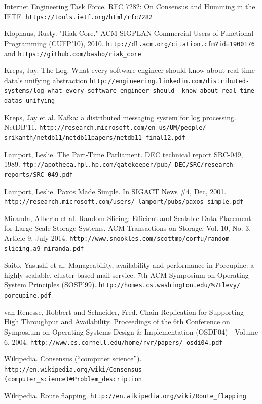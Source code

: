 \documentclass[preprint,10pt]{sigplanconf}
\begin{document}
\begin{thebibliography}{}
Internet Engineering Task Force.
RFC 7282: On Consensus and Humming in the IETF.
{\tt https://tools.ietf.org/html/rfc7282}

Klophaus, Rusty.
"Riak Core."
ACM SIGPLAN Commercial Users of Functional Programming (CUFP'10), 2010.
{\tt http://dl.acm.org/citation.cfm?id=1900176} and
{\tt https://github.com/basho/riak\_core}

Kreps, Jay.
The Log: What every software engineer should know about real-time data's unifying abstraction
{\tt http://engineering.linkedin.com/distributed-
  systems/log-what-every-software-engineer-should-
  know-about-real-time-datas-unifying}

Kreps, Jay et al.
Kafka: a distributed messaging system for log processing.
NetDB’11.
{\tt http://research.microsoft.com/en-us/UM/people/
  srikanth/netdb11/netdb11papers/netdb11-final12.pdf}

Lamport, Leslie.
The Part-Time Parliament.
DEC technical report SRC-049, 1989.
{\tt ftp://apotheca.hpl.hp.com/gatekeeper/pub/ DEC/SRC/research-reports/SRC-049.pdf}

Lamport, Leslie.
Paxos Made Simple.
In SIGACT News \#4, Dec, 2001.
{\tt http://research.microsoft.com/users/ lamport/pubs/paxos-simple.pdf}

Miranda, Alberto et al.
Random Slicing: Efficient and Scalable Data Placement for Large-Scale Storage Systems.
ACM Transactions on Storage, Vol. 10, No. 3, Article 9, July 2014.
{\tt http://www.snookles.com/scottmp/corfu/random- slicing.a9-miranda.pdf}

Saito, Yasushi et al.
Manageability, availability and performance in Porcupine: a highly scalable, cluster-based mail service.
7th ACM Symposium on Operating System Principles (SOSP’99).
{\tt http://homes.cs.washington.edu/\%7Elevy/ porcupine.pdf}

van Renesse, Robbert and Schneider, Fred.
Chain Replication for Supporting High Throughput and Availability.
Proceedings of the 6th Conference on Symposium on Operating Systems
Design \& Implementation (OSDI'04) - Volume 6, 2004.
{\tt http://www.cs.cornell.edu/home/rvr/papers/ osdi04.pdf}

Wikipedia.
Consensus (``computer science'').
{\tt http://en.wikipedia.org/wiki/Consensus\_ (computer\_science)\#Problem\_description}

Wikipedia.
Route flapping.
{\tt http://en.wikipedia.org/wiki/Route\_flapping}

\end{thebibliography}
\end{document}
